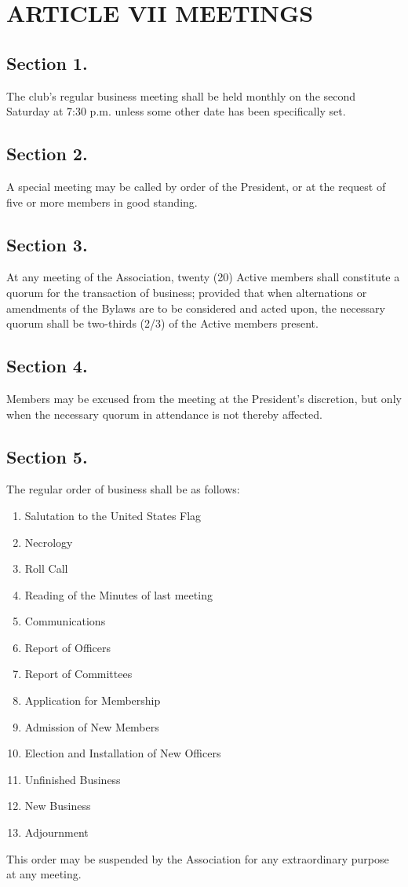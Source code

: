 \documentclass[12pt,letterpaper]{article}
\begin{document}
\section*{ARTICLE VII
MEETINGS}
\subsection*{Section 1.} The club’s regular business meeting shall be held monthly on the second
Saturday at 7:30 p.m. unless some other date has been specifically set.
\subsection*{Section 2.} A special meeting may be called by order of the President, or at the request
of five or more members in good standing.
\subsection*{Section 3.} At any meeting of the Association, twenty (20) Active members shall
constitute a quorum for the transaction of business; provided that when alternations or
amendments of the Bylaws are to be considered and acted upon, the necessary quorum
shall be two-thirds (2/3) of the Active members present.
\subsection*{Section 4.} Members may be excused from the meeting at the President’s discretion,
but only when the necessary quorum in attendance is not thereby affected.
\subsection*{Section 5.} The regular order of business shall be as follows:
\begin{enumerate}
\item Salutation to the United States Flag
\item Necrology
\item Roll Call
\item Reading of the Minutes of last meeting
\item Communications
\item Report of Officers
\item Report of Committees
\item Application for Membership
\item Admission of New Members
\item Election and Installation of New Officers
\item Unfinished Business
\item New Business
\item Adjournment
\end{enumerate}
This order may be suspended by the Association for any extraordinary purpose at any
meeting.
\end{document}
